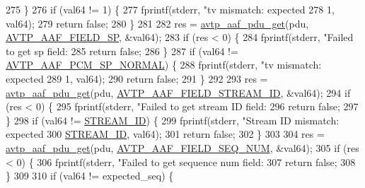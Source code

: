 \begin{DoxyCode}
{{{{{275     \}
276     \textcolor{keywordflow}{if} (val64 != 1) \{
277         fprintf(stderr, \textcolor{stringliteral}{"tv mismatch: expected %
278                                 1, val64);
279         \textcolor{keywordflow}{return} \textcolor{keyword}{false};
280     \}
281 
282     res = \hyperlink{avtp__aaf_8h_acc4c927b036e22def8e6b6beb3ac6026}{avtp\_aaf\_pdu\_get}(pdu, \hyperlink{avtp__aaf_8h_a7eaee6c1ebc806c0401dbe7b14cd22dba79d34018cdf39cf46998df2bc16e7617}{AVTP\_AAF\_FIELD\_SP}, &val64);
283     \textcolor{keywordflow}{if} (res < 0) \{
284         fprintf(stderr, \textcolor{stringliteral}{"Failed to get sp field: %
285         \textcolor{keywordflow}{return} \textcolor{keyword}{false};
286     \}
287     \textcolor{keywordflow}{if} (val64 != \hyperlink{avtp__aaf_8h_a70d680c008a86c9899abf41a18e89a51}{AVTP\_AAF\_PCM\_SP\_NORMAL}) \{
288         fprintf(stderr, \textcolor{stringliteral}{"tv mismatch: expected %
289                                 1, val64);
290         \textcolor{keywordflow}{return} \textcolor{keyword}{false};
291     \}
292 
293     res = \hyperlink{avtp__aaf_8h_acc4c927b036e22def8e6b6beb3ac6026}{avtp\_aaf\_pdu\_get}(pdu, \hyperlink{avtp__aaf_8h_a7eaee6c1ebc806c0401dbe7b14cd22dba4760c4bfc01d5a5200aa35cc1cdc0c13}{AVTP\_AAF\_FIELD\_STREAM\_ID}, &val64);
294     \textcolor{keywordflow}{if} (res < 0) \{
295         fprintf(stderr, \textcolor{stringliteral}{"Failed to get stream ID field: %
296         \textcolor{keywordflow}{return} \textcolor{keyword}{false};
297     \}
298     \textcolor{keywordflow}{if} (val64 != \hyperlink{aaf-listener_8c_ade86a80a3d067dece1f7e7cf957e3e92}{STREAM\_ID}) \{
299         fprintf(stderr, \textcolor{stringliteral}{"Stream ID mismatch: expected %
300                             \hyperlink{aaf-listener_8c_ade86a80a3d067dece1f7e7cf957e3e92}{STREAM\_ID}, val64);
301         \textcolor{keywordflow}{return} \textcolor{keyword}{false};
302     \}
303 
304     res = \hyperlink{avtp__aaf_8h_acc4c927b036e22def8e6b6beb3ac6026}{avtp\_aaf\_pdu\_get}(pdu, \hyperlink{avtp__aaf_8h_a7eaee6c1ebc806c0401dbe7b14cd22dba8d6f89598372ef8aaf5dfbbf0c4c7111}{AVTP\_AAF\_FIELD\_SEQ\_NUM}, &val64);
305     \textcolor{keywordflow}{if} (res < 0) \{
306         fprintf(stderr, \textcolor{stringliteral}{"Failed to get sequence num field: %
307         \textcolor{keywordflow}{return} \textcolor{keyword}{false};
308     \}
309 
310     \textcolor{keywordflow}{if} (val64 != expected\_seq) \{
}}}}}}}}}}}
\end{DoxyCode}
